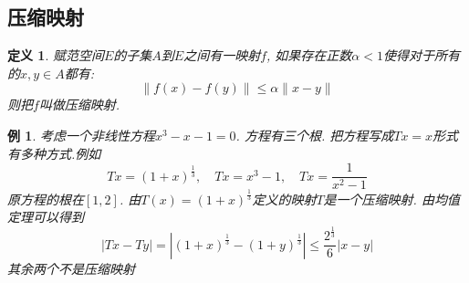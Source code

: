 \documentclass[a4paper,11pt]{book}
\newtheorem{definition}{\hspace{2em}定义}[section]
\newtheorem{example}{例}[section]
\begin{document}
\subsection*{压缩映射}
\begin{definition}
  赋范空间$E$的子集$A$到$E$之间有一映射$f$, 如果存在正数$\alpha<1$使得对于所有的$x,y\in A$都有:
  \begin{equation*}
    \|f(x)-f(y)\|\leq\alpha\|x-y\|
  \end{equation*}
  则把$f$叫做压缩映射.
\end{definition}
\begin{example}
  考虑一个非线性方程$x^3-x-1=0$. 方程有三个根. 把方程写成$Tx=x$形式有多种方式.例如
  \begin{equation*}
    Tx=(1+x)^{\frac{1}{3}},\quad Tx=x^3-1,\quad Tx=\frac{1}{x^2-1}
  \end{equation*}
  原方程的根在$[1,2]$. 由$T(x)=(1+x)^{\frac{1}{3}}$定义的映射$T$是一个压缩映射. 由均值定理可以得到
  \begin{equation*}
    |Tx-Ty|=|(1+x)^{\frac{1}{3}}-(1+y)^{\frac{1}{3}}|\leq\frac{2^{\frac{1}{3}}}{6}|x-y|
  \end{equation*}
  其余两个不是压缩映射
\end{example}
\end{document}
